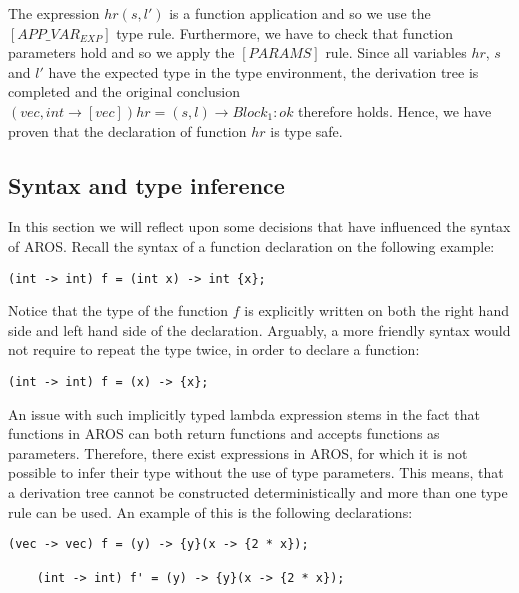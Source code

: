 \newblock
\par
The expression $hr(s,l')$ is a function application and so we use the $[APP\_VAR_{EXP}]$ type rule. Furthermore, we have to check that function parameters hold and so we apply the $[PARAMS]$ rule. Since all variables $hr$, $s$ and $l'$ have the expected type in the type environment, the derivation tree is completed and the original conclusion $(vec, int \rightarrow [vec]) hr = (s,l) \rightarrow Block_1 \colon ok$ therefore holds. Hence, we have proven that the declaration of function $hr$ is type safe. 

\subsection{Syntax and type inference}

\newblock
\par
In this section we will reflect upon some decisions that have influenced the syntax of AROS. Recall the syntax of a function declaration on the following example:

\newblock
\begin{lstlisting}[language=aros]
(int -> int) f = (int x) -> int {x};
\end{lstlisting}

\newblock
\par
Notice that the type of the function $f$ is explicitly written on both the right hand side and left hand side of the declaration. Arguably, a more friendly syntax would not require to repeat the type twice, in order to declare a function:

\newblock
\begin{lstlisting}[language=aros]
(int -> int) f = (x) -> {x};
\end{lstlisting}

\newblock
\par
An issue with such implicitly typed lambda expression stems in the fact that functions in AROS can both return functions and accepts functions as parameters. Therefore, there exist expressions in AROS, for which it is not possible to infer their type without the use of type parameters. This means, that a derivation tree cannot be constructed deterministically and more than one type rule can be used. An example of this is the following declarations:

\newblock
\begin{lstlisting}[language=aros]
    (vec -> vec) f = (y) -> {y}(x -> {2 * x});
    
    (int -> int) f' = (y) -> {y}(x -> {2 * x});
\end{lstlisting}

